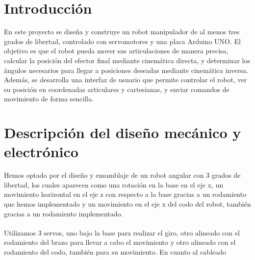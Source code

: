 \documentclass[11pt]{article}
\begin{document}






\section{Introducción}
\label{sec:introduccion}
En este proyecto se diseña y construye un robot manipulador de al menos tres grados de libertad, controlado con servomotores y una placa Arduino UNO. El objetivo es que el robot pueda mover sus articulaciones de manera precisa, calcular la posición del efector final mediante cinemática directa, y determinar los ángulos necesarios para llegar a posiciones deseadas mediante cinemática inversa.
Además, se desarrolla una interfaz de usuario que permite controlar el robot, ver su posición en coordenadas articulares y cartesianas, y enviar comandos de movimiento de forma sencilla.


\section{Descripción del diseño mecánico y electrónico}
\label{sec:diseño}
Hemos optado por el diseño y ensamblaje de un robot angular con 3 grados de libertad, los cuales aparecen como una rotación en la base en el eje x, un movimiento horizontal en el eje z con respecto a la base gracias a un rodamiento que hemos implementado y un movimiento en el eje x del codo del robot, también gracias a un rodamiento implementado.
\\ \\
Utilizamos 3 servos, uno bajo la base para realizar el giro, otro alineado con el rodamiento del brazo para llevar a cabo el movimiento y otro alineado con el rodamiento del codo, también para su movimiento. En cuanto al cableado
\end{document}

